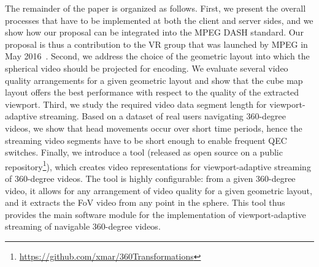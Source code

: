 The remainder of the paper is organized as follows. First, we present
the overall processes that have to be implemented at both the client
and server sides, and we show how our proposal can be integrated into
the MPEG \ac{DASH} standard. Our proposal is thus a contribution to
the \ac{VR} group that was launched by MPEG in May
2016~\cite{mpeg-vr}. Second, we address the choice of the geometric
layout into which the spherical video should be projected for
encoding. We evaluate several video quality arrangements for a given
geometric layout and show that the cube map layout offers the best
performance with respect to the quality of the extracted viewport.
Third, we study the required video data segment length for
viewport-adaptive streaming. Based on a dataset of real users
navigating 360-degree videos, we show that head movements occur over
short time periods, hence the streaming video segments have to be
short enough to enable frequent \ac{QEC} switches. Finally, we
introduce a tool (released as open source on a public
repository\footnote{\url{https://github.com/xmar/360Transformations}}),
which creates video representations for viewport-adaptive streaming of
360-degree videos. The tool is highly configurable: from a given
360-degree video, it allows for any arrangement of video quality for a
given geometric layout, and it extracts the \ac{FoV} video from any
point in the sphere. This tool thus provides the main software module
for the implementation of viewport-adaptive streaming of navigable
360-degree videos.


%
%
%
%


